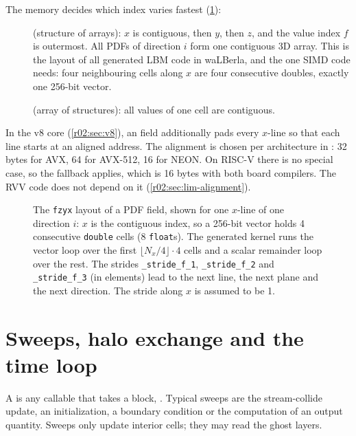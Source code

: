 The memory  decides which index varies fastest
(\cref{r02:fig:fzyx}):
\begin{description}
  \item[] (structure of arrays): $x$ is contiguous, then $y$, then $z$, and
    the value index $f$ is outermost. All PDFs of direction $i$ form one contiguous 3D
    array. This is the layout of all generated LBM code in waLBerla, and the one SIMD
    code needs: four neighbouring cells along $x$ are four consecutive doubles, exactly
    one 256-bit vector.
  \item[] (array of structures): all values of one cell are contiguous.
\end{description}
In the v8 core (\cref{r02:sec:v8}), an  field additionally pads every
$x$-line so that each line starts at an aligned address. The alignment is chosen per
architecture in : 32 bytes for AVX,
64 for AVX-512, 16 for NEON. On RISC-V there is no special case, so the fallback
 applies, which is 16 bytes with both board compilers. The
RVV code does not depend on it (\cref{r02:sec:lim-alignment}).

\begin{figure}[htbp]
  \centering
  
  \caption[The fzyx layout and vectorization along x]{The \texttt{fzyx} layout of a PDF
    field, shown for one $x$-line of one direction $i$: $x$ is the contiguous index, so
    a 256-bit vector holds 4 consecutive \texttt{double} cells (8 \texttt{float}s). The
    generated kernel runs the vector loop over the first $\lfloor N_x/4\rfloor\cdot 4$
    cells and a scalar remainder loop over the rest. The strides
    \texttt{\_stride\_f\_1}, \texttt{\_stride\_f\_2} and \texttt{\_stride\_f\_3} (in
    elements) lead to the next line, the next plane and the next direction. The stride
    along $x$ is assumed to be 1.}
  \label{r02:fig:fzyx}
\end{figure}

\section{Sweeps, halo exchange and the time loop}\label{r02:sec:sweeps}

A  is any callable that takes a block, .
Typical sweeps are the stream-collide update, an initialization, a boundary condition
or the computation of an output quantity. Sweeps only update interior cells; they may
read the ghost layers.

